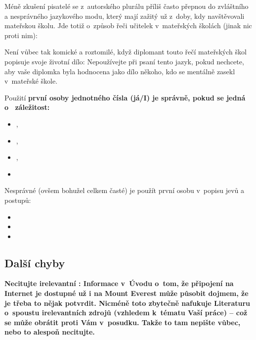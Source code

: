 Méně zkušení pisatelé se z~autorského plurálu příliš často přepnou do zvláštního a nesprávného jazykového modu, který mají zažitý už z~doby, kdy navštěvovali mateřskou školu. Jde totiž o~způsob řeči učitelek v~mateřských školách (jinak nic proti nim): 

Není vůbec tak komické a roztomilé, když diplomant touto řečí mateřských škol popisuje svoje životní dílo:  Nepoužívejte při psaní tento jazyk, pokud nechcete, aby vaše diplomka byla hodnocena jako dílo někoho, kdo se mentálně zasekl v~mateřské škole.

Použití \bf první osoby jednotného čísla \rm (já/I) je správně, pokud se jedná o~ záležitost:
\begin{itemize}
  \item{},
  \item{},
  \item{},
  \item{}
\end{itemize}

Nesprávné (ovšem bohužel celkem časté) je použít první osobu v~popisu jevů a postupů:
\begin{itemize}
  \item{}
  \item{}
  \item{}
\end{itemize}

\subsection*{Další chyby}

\bf Necitujte irelevantní : \rm Informace v~Úvodu o~tom, že připojení na Internet je dostupné už i na Mount Everest může působit dojmem, že je třeba to nějak potvrdit. Nicméně toto zbytečně nafukuje Literaturu o~spoustu irelevantních zdrojů (vzhledem k~tématu Vaší práce) -- což se může obrátit proti Vám v~posudku. Takže to tam nepište vůbec, nebo to alespoň necitujte.

